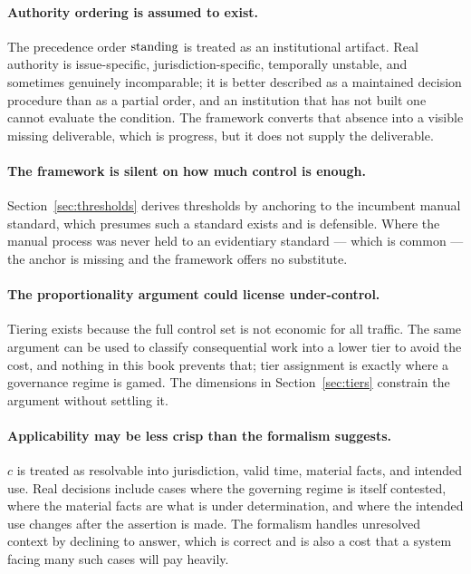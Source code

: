 \paragraph{Authority ordering is assumed to exist.} The precedence order $\operatorname{standing}$ is
treated as an institutional artifact. Real authority is issue-specific,
jurisdiction-specific, temporally unstable, and sometimes genuinely incomparable; it is
better described as a maintained decision procedure than as a partial order, and an
institution that has not built one cannot evaluate the condition. The framework converts
that absence into a visible missing deliverable, which is progress, but it does not
supply the deliverable.

\paragraph{The framework is silent on how much control is enough.}
Section~\ref{sec:thresholds} derives thresholds by anchoring to the incumbent manual
standard, which presumes such a standard exists and is defensible. Where the manual
process was never held to an evidentiary standard --- which is common --- the anchor is
missing and the framework offers no substitute.

\paragraph{The proportionality argument could license under-control.} Tiering exists
because the full control set is not economic for all traffic. The same argument can be
used to classify consequential work into a lower tier to avoid the cost, and nothing in
this book prevents that; tier assignment is exactly where a governance regime is
gamed. The dimensions in Section~\ref{sec:tiers} constrain the argument without settling
it.

\paragraph{Applicability may be less crisp than the formalism suggests.} $c$ is treated
as resolvable into jurisdiction, valid time, material facts, and intended use. Real
decisions include cases where the governing regime is itself contested, where the
material facts are what is under determination, and where the intended use changes after
the assertion is made. The formalism handles unresolved context by declining to answer,
which is correct and is also a cost that a system facing many such cases will pay
heavily.

